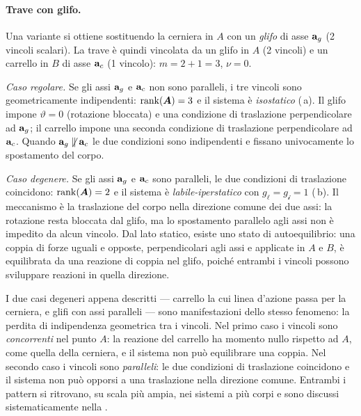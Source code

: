 \paragraph{Trave con glifo.}
Una variante si ottiene sostituendo la cerniera in $A$
con un \emph{glifo} di asse $\mathbf{a}_g$ (2 vincoli scalari).
La trave è quindi vincolata da un glifo in $A$ (2 vincoli)
e un carrello in $B$ di asse $\mathbf{a}_c$ (1 vincolo):
$m = 2 + 1 = 3$, $\nu = 0$.

\smallskip
\noindent\textit{Caso regolare.}
Se gli assi $\mathbf{a}_g$ e $\mathbf{a}_c$ non sono paralleli, i tre
vincoli sono geometricamente indipendenti:
$\operatorname{rank}(\bm{A}) = 3$ e il sistema è \textit{isostatico}
(\,a).
Il glifo impone $\vartheta = 0$ (rotazione bloccata) e una
condizione di traslazione perpendicolare ad $\mathbf{a}_g$;
il carrello impone una seconda condizione di traslazione
perpendicolare ad $\mathbf{a}_c$. Quando $\mathbf{a}_g \not\parallel \mathbf{a}_c$
le due condizioni sono indipendenti e fissano univocamente
lo spostamento del corpo.

\smallskip
\noindent\textit{Caso degenere.}
Se gli assi $\mathbf{a}_g$ e $\mathbf{a}_c$ sono paralleli, le due
condizioni di traslazione coincidono: $\operatorname{rank}(\bm{A}) = 2$ e
il sistema è \textit{labile-iperstatico} con
$g_\ell = g_{\mathscr{i}} = 1$
(\,b).
Il meccanismo è la traslazione del corpo nella direzione
comune dei due assi: la rotazione resta bloccata dal glifo,
ma lo spostamento parallelo agli assi non è impedito da
alcun vincolo. Dal lato statico, esiste uno stato di
autoequilibrio: una coppia di forze uguali e opposte,
perpendicolari agli assi e applicate in $A$ e $B$, è
equilibrata da una reazione di coppia nel glifo, poiché
entrambi i vincoli possono sviluppare reazioni in quella
direzione.








\begin{oss}
	I due casi degeneri appena descritti ---
	carrello la cui linea d'azione passa per la
	cerniera, e glifi con assi paralleli --- sono
	manifestazioni dello stesso fenomeno: la perdita
	di indipendenza geometrica tra i vincoli. Nel
	primo caso i vincoli sono \emph{concorrenti}
	nel punto $A$: la reazione del carrello ha
	momento nullo rispetto ad $A$, come quella
	della cerniera, e il sistema non può equilibrare
	una coppia. Nel secondo caso i vincoli sono
	\emph{paralleli}: le due condizioni di
	traslazione coincidono e il sistema non può
	opporsi a una traslazione nella direzione
	comune. Entrambi i pattern si ritrovano, su
	scala più ampia, nei sistemi a più corpi e
	sono discussi sistematicamente nella
	.
\end{oss}

